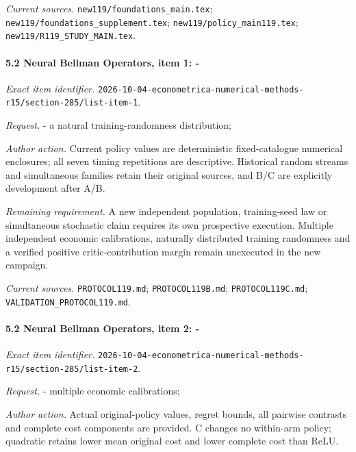 \par\emph{Current sources.} \nolinkurl{new119/foundations_main.tex}; \nolinkurl{new119/foundations_supplement.tex}; \nolinkurl{new119/policy_main119.tex}; \nolinkurl{new119/R119_STUDY_MAIN.tex}.

\paragraph{5.2 Neural Bellman Operators, item 1: -}

\emph{Exact item identifier.} \nolinkurl{2026-10-04-econometrica-numerical-methods-r15/section-285/list-item-1}.

\par\emph{Request.} - a natural training-randomness distribution;

\par\emph{Author action.} Current policy values are deterministic fixed-catalogue numerical enclosures; all seven timing repetitions are descriptive. Historical random streams and simultaneous families retain their original sources, and B/\allowbreak{}C are explicitly development after A/\allowbreak{}B.

\par\emph{Remaining requirement.} A new independent population, training-seed law or simultaneous stochastic claim requires its own prospective execution. Multiple independent economic calibrations, naturally distributed training randomness and a verified positive critic-contribution margin remain unexecuted in the new campaign.

\par\emph{Current sources.} \nolinkurl{PROTOCOL119.md}; \nolinkurl{PROTOCOL119B.md}; \nolinkurl{PROTOCOL119C.md}; \nolinkurl{VALIDATION_PROTOCOL119.md}.

\paragraph{5.2 Neural Bellman Operators, item 2: -}

\emph{Exact item identifier.} \nolinkurl{2026-10-04-econometrica-numerical-methods-r15/section-285/list-item-2}.

\par\emph{Request.} - multiple economic calibrations;

\par\emph{Author action.} Actual original-policy values, regret bounds, all pairwise contrasts and complete cost components are provided. C changes no within-arm policy; quadratic retains lower mean original cost and lower complete cost than ReLU.

